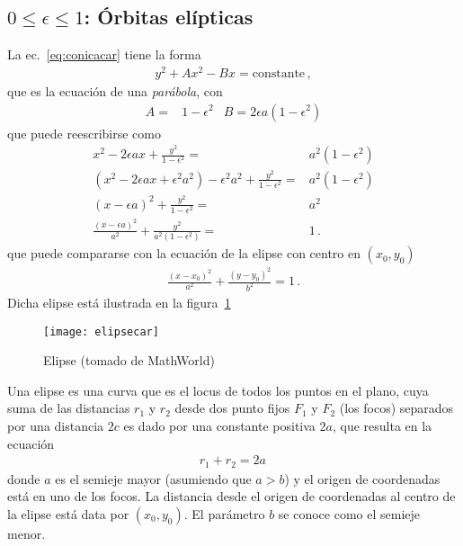 \subsection{$0\le \epsilon\le 1$: Órbitas elípticas}
La ec.~\eqref{eq:conicacar} tiene la forma
\begin{align}
    y^2+A x^2-Bx=\text{constante}\,,
  \end{align}
que es la ecuación de una \emph{parábola}, con
\begin{align}
  A=&1-\epsilon^2& B=2\epsilon a(1-\epsilon^2)
\end{align}
que puede reescribirse como
\begin{align}
  \label{eq:eli1}
x^2-2\epsilon ax + \frac{y^2}{1-\epsilon^2}=&a^2(1-\epsilon^2)\nonumber\\
(x^2-2\epsilon ax+\epsilon^2a^2)-\epsilon^2a^2 + \frac{y^2}{1-\epsilon^2}=&a^2(1-\epsilon^2)\nonumber\\
(x-\epsilon a)^2+ \frac{y^2}{1-\epsilon^2}=&a^2\nonumber\\
\frac{(x-\epsilon a)^2}{a^2}+\frac{y^2}{a^2(1-\epsilon^2)}=&1\,.
\end{align}
que puede compararse con la ecuación de la elipse con centro en $(x_0,y_0)$
\begin{align}
  \label{eq:hip2}
\frac{(x-x_0)^2}{a^2}+\frac{(y-y_0)^2}{b^2}=1\,.
\end{align}
Dicha elipse está ilustrada en la figura~\ref{fig:elipsecar}
\begin{frame}
  

\begin{figure}
  \centering
  \texttt{[image: elipsecar]}
  \caption{Elipse (tomado de MathWorld)}
  \label{fig:elipsecar}
\end{figure}
\end{frame}
Una elipse es una curva que es el locus de todos los puntos en el plano, cuya suma de las distancias $r_1$ y $r_2$ desde dos punto fijos $F_1$ y $F_2$ (los focos) separados por una distancia $2c$ es dado por una constante positiva $2a$, que resulta en la ecuación
\begin{align}
  r_1+r_2=2a\,
\end{align}
donde $a$ es el semieje mayor (asumiendo que $a>b$) y el origen de coordenadas está en uno de los focos. La distancia desde el origen de coordenadas al centro de la elipse está data por $(x_0,y_0)$. El parámetro $b$ se conoce como el semieje menor.  


